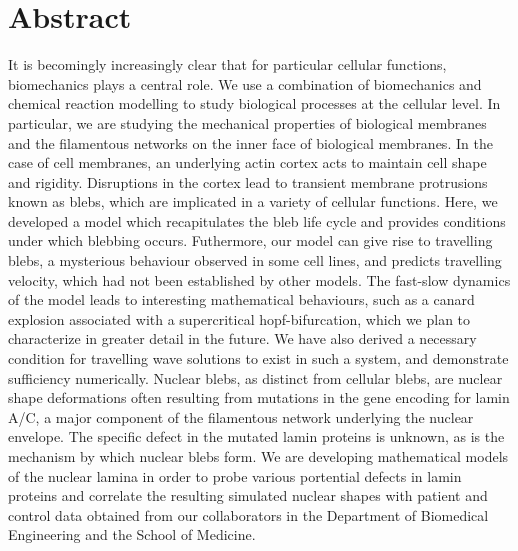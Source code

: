 \chapter{Abstract}

It is becomingly increasingly clear that for particular cellular functions, biomechanics plays a central role. We use a combination of biomechanics and chemical reaction modelling to study biological processes at the cellular level. In particular, we are studying the mechanical properties of biological membranes and the filamentous networks on the inner face of biological membranes. In the case of cell membranes, an underlying actin cortex acts to maintain cell shape and rigidity. Disruptions in the cortex lead to transient membrane protrusions known as blebs, which are implicated in a variety of cellular functions. Here, we developed a model which recapitulates the bleb life cycle and provides conditions under which blebbing occurs. Futhermore, our model can give rise to travelling blebs, a mysterious behaviour observed in some cell lines, and predicts travelling velocity, which had not been established by other models. The fast-slow dynamics of the model leads to interesting mathematical behaviours, such as a canard explosion associated with a supercritical hopf-bifurcation, which we plan to characterize in greater detail in the future. We have also derived a necessary condition for travelling wave solutions to exist in such a system, and demonstrate sufficiency numerically. Nuclear blebs, as distinct from cellular blebs, are nuclear shape deformations often resulting from mutations in the gene encoding for lamin A/C, a major component of the filamentous network underlying the nuclear envelope. The specific defect in the mutated lamin proteins is unknown, as is the mechanism by which nuclear blebs form. We are developing mathematical models of the nuclear lamina in order to probe various portential defects in lamin proteins and correlate the resulting simulated nuclear shapes with patient and control data obtained from our collaborators in the Department of Biomedical Engineering  and the School of Medicine. 

